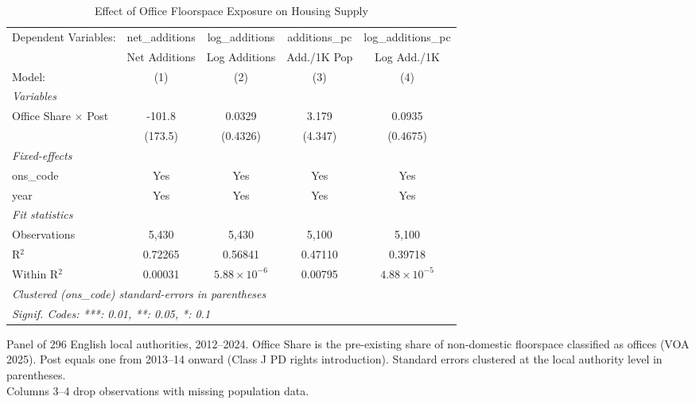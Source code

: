 
\begin{table}[htbp]
   \caption{\label{tab:main} Effect of Office Floorspace Exposure on Housing Supply}
   \centering
   \footnotesize\begin{tabular}{lcccc}
      \tabularnewline \midrule \midrule
      Dependent Variables:        & net\_additions  & log\_additions        & additions\_pc  & log\_additions\_pc\\    
                                  & Net Additions   & Log Additions         & Add./1K Pop    & Log Add./1K \\   
      Model:                      & (1)             & (2)                   & (3)            & (4)\\  
      \midrule
      \emph{Variables}\\
      Office Share $\times$ Post  & -101.8          & 0.0329                & 3.179          & 0.0935\\   
                                  & (173.5)         & (0.4326)              & (4.347)        & (0.4675)\\   
      \midrule
      \emph{Fixed-effects}\\
      ons\_code                   & Yes             & Yes                   & Yes            & Yes\\  
      year                        & Yes             & Yes                   & Yes            & Yes\\  
      \midrule
      \emph{Fit statistics}\\
      Observations                & 5,430           & 5,430                 & 5,100          & 5,100\\  
      R$^2$                       & 0.72265         & 0.56841               & 0.47110        & 0.39718\\  
      Within R$^2$                & 0.00031         & $5.88\times 10^{-6}$  & 0.00795        & $4.88\times 10^{-5}$\\   
      \midrule \midrule
      \multicolumn{5}{l}{\emph{Clustered (ons\_code) standard-errors in parentheses}}\\
      \multicolumn{5}{l}{\emph{Signif. Codes: ***: 0.01, **: 0.05, *: 0.1}}\\
   \end{tabular}
   
   \par \raggedright 
   Panel of 296 English local authorities, 2012--2024. Office Share is the pre-existing share of non-domestic floorspace classified as offices (VOA 2025). Post equals one from 2013--14 onward (Class J PD rights introduction). Standard errors clustered at the local authority level in parentheses.\\
   Columns 3--4 drop observations with missing population data.
\end{table}


